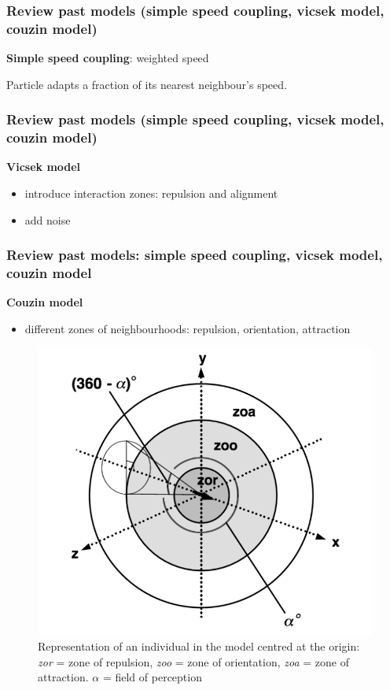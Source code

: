 \documentclass[compress]{beamer}
\begin{document}
\begin{frame}
	\frametitle{Review past models (simple speed coupling, vicsek model, couzin model)}
	
\textbf{Simple speed coupling}: weighted speed

\hspace{1cm}

Particle adapts a fraction of its nearest neighbour's speed.

\end{frame}


\begin{frame}
	\frametitle{Review past models (simple speed coupling, vicsek model, couzin model)}
	
	\textbf{Vicsek model} \\
	
	
	\begin{itemize}
		\item introduce interaction zones: repulsion and alignment
		\item add noise
	\end{itemize}
	
\end{frame}


\begin{frame}
	\frametitle{Review past models: simple speed coupling, vicsek model, couzin model}
	
	\textbf{Couzin model}
	
	\begin{itemize}
		\item different zones of neighbourhoods: repulsion, orientation, attraction
	\end{itemize}
	
\begin{figure}
	\includegraphics[width=.45\columnwidth]{./img/zones.png}
	\caption{Representation of an individual in the model centred at the origin: \textit{zor} = zone of repulsion, \textit{zoo} = zone of orientation, \textit{zoa} = zone of attraction. \( \alpha \) = field of perception}
	\label{zones}
\end{figure}

	
\end{frame}
\end{document}
